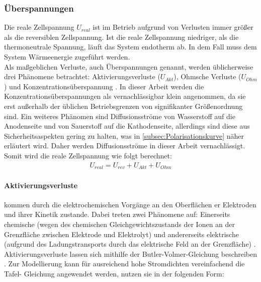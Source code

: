 \subsubsection{Überspannungen}
\label{subsubsec:Überspannungen}
Die reale Zellspannung $U_{real}$ ist im Betrieb aufgrund von Verlusten immer größer als die reversiblen Zellspannung. Ist die reale Zellspannung niedriger, als die thermoneutrale Spannung, läuft das System endotherm ab. In dem Fall muss dem System Wärmeenergie zugeführt werden.\\
Als maßgeblichen Verluste, auch Überspannungen genannt, werden üblicherweise drei Phänomene betrachtet: Aktivierungsverluste ($U_{Akt}$), Ohmsche Verluste ($U_{Ohm}$) und Konzentrationsüberspannung \citep{falcao_review_2020}. In dieser Arbeit werden die Konzentrationsüberspannungen als vernachlässigbar klein angenommen, da sie erst außerhalb der üblichen Betriebsgrenzen von signifikanter Größenordnung sind. Ein weiteres Phänomen sind Diffusionsströme von Wasserstoff auf die Anodenseite und von Sauerstoff auf die Kathodenseite, allerdings sind diese aus Sicherheitsaspekten gering zu halten, was in \ref{subsec:Polarisationskurve} näher erläutert wird. Daher werden Diffusionsströme in dieser Arbeit vernachlässigt. Somit wird die reale Zellspannung wie folgt berechnet:\\

\begin{align}
	\label{gl:U_realEL}
	U_{real} =  U_{rev} + U_{Akt} + U_{Ohm}
\end{align}   

\paragraph{Aktivierungsverluste} kommen durch die elektrochemischen Vorgänge an den Oberflächen er Elektroden und ihrer Kinetik zustande. Dabei treten zwei Phänomene auf:  Einerseits chemische (wegen des chemischen Gleichgewichtszustands der Ionen an der Grenzfläche zwischen Elektrode und Elektrolyt) und andererseits elektrische (aufgrund des Ladungstransports durch das elektrische Feld an der Grenzfläche) \citep{stempien_solid_2013}. Aktivierungsverluste lassen sich mithilfe der Butler-Volmer-Gleichung beschreiben \citep{olivier_low-temperature_2017,stempien_solid_2013}. Zur Modellierung kann für ausreichend hohe Stromdichten vereinfachend die Tafel- Gleichung angewendet werden, \citet{abdin_modelling_2015} nutzen sie in der folgenden Form:\\

